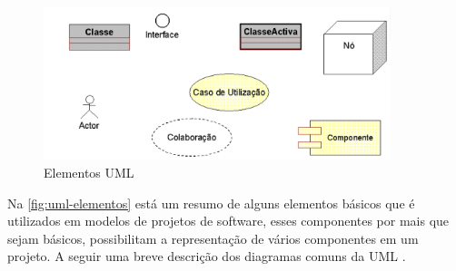     \begin{figure}[H]
              \caption{\label{fig:uml-elementos}{Elementos UML}}
              \centering
              \includegraphics[width=0.9\textwidth]{Figuras/uml1.PNG}
        \end{figure}
    \par
    Na \autoref{fig:uml-elementos} está um resumo de alguns elementos básicos que é utilizados em modelos de projetos de software, esses componentes por mais que sejam básicos, possibilitam a representação de vários componentes em um projeto. A seguir uma breve descrição dos diagramas comuns da UML \cite{nunesfundamental,uml}.
    
